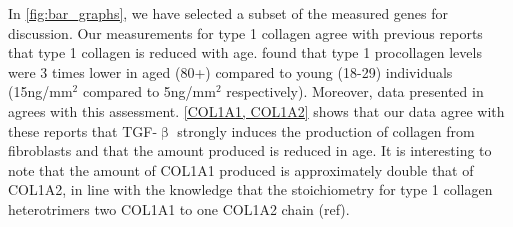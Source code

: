 \documentclass[alpha-refs]{wiley-article}
\newcommand{\tgf}{TGF-$\upbeta$}
\begin{document}


In \cref{fig:bar_graphs}, we have selected a subset of the measured genes for discussion. Our measurements for type 1 collagen agree with previous reports that type 1 collagen is reduced with age. \cite{Varani2006} found that type 1 procollagen levels were 3 times lower in aged (80+) compared to young (18-29) individuals (15ng/mm$^2$ compared to 5ng/mm$^2$ respectively). Moreover, data presented in \cite{Quan2010} agrees with this assessment. \cref{COL1A1, COL1A2} shows that our data agree with these reports that \tgf{} strongly induces the production of collagen from fibroblasts and that the amount produced is reduced in age. It is interesting to note that the amount of COL1A1 produced is approximately double that of COL1A2, in line with the knowledge that the stoichiometry for type 1 collagen heterotrimers two COL1A1 to one COL1A2 chain (ref). 
\end{document}
